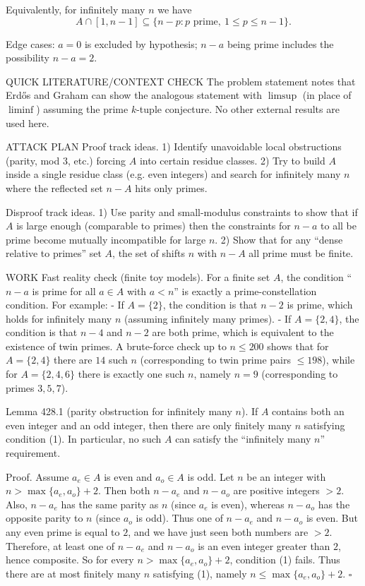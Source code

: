 Equivalently, for infinitely many $n$ we have
\[
A\cap[1,n-1]\subseteq \{n-p: p\text{ prime},\ 1\le p\le n-1\}.
\]

Edge cases: $a=0$ is excluded by hypothesis; $n-a$ being prime includes the possibility $n-a=2$.

QUICK LITERATURE/CONTEXT CHECK
The problem statement notes that Erd\H{o}s and Graham can show the analogous statement with $\limsup$ (in place of $\liminf$) assuming the prime $k$-tuple conjecture. No other external results are used here.

ATTACK PLAN
Proof track ideas.
1) Identify unavoidable local obstructions (parity, mod $3$, etc.) forcing $A$ into certain residue classes.
2) Try to build $A$ inside a single residue class (e.g. even integers) and search for infinitely many $n$ where the reflected set $n-A$ hits only primes.

Disproof track ideas.
1) Use parity and small-modulus constraints to show that if $A$ is large enough (comparable to primes) then the constraints for $n-a$ to all be prime become mutually incompatible for large $n$.
2) Show that for any “dense relative to primes” set $A$, the set of shifts $n$ with $n-A$ all prime must be finite.

WORK
Fast reality check (finite toy models).
For a finite set $A$, the condition “$n-a$ is prime for all $a\in A$ with $a<n$” is exactly a prime-constellation condition.
For example:
- If $A=\{2\}$, the condition is that $n-2$ is prime, which holds for infinitely many $n$ (assuming infinitely many primes).
- If $A=\{2,4\}$, the condition is that $n-4$ and $n-2$ are both prime, which is equivalent to the existence of twin primes.
A brute-force check up to $n\le 200$ shows that for $A=\{2,4\}$ there are $14$ such $n$ (corresponding to twin prime pairs $\le 198$), while for $A=\{2,4,6\}$ there is exactly one such $n$, namely $n=9$ (corresponding to primes $3,5,7$).

Lemma 428.1 (parity obstruction for infinitely many $n$).
If $A$ contains both an even integer and an odd integer, then there are only finitely many $n$ satisfying condition (1). In particular, no such $A$ can satisfy the “infinitely many $n$” requirement.

Proof.
Assume $a_e\in A$ is even and $a_o\in A$ is odd.
Let $n$ be an integer with $n>\max\{a_e,a_o\}+2$.
Then both $n-a_e$ and $n-a_o$ are positive integers $>2$.
Also, $n-a_e$ has the same parity as $n$ (since $a_e$ is even), whereas $n-a_o$ has the opposite parity to $n$ (since $a_o$ is odd). Thus one of $n-a_e$ and $n-a_o$ is even.
But any even prime is equal to $2$, and we have just seen both numbers are $>2$. Therefore, at least one of $n-a_e$ and $n-a_o$ is an even integer greater than $2$, hence composite.
So for every $n>\max\{a_e,a_o\}+2$, condition (1) fails.
Thus there are at most finitely many $n$ satisfying (1), namely $n\le \max\{a_e,a_o\}+2$.
\hfill $\square$

